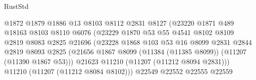 \begin{lexlean}{RustStd}
\begin{coremodule}
                                        @1872
                                        @1879
                                        @1886
                                        @13
                                        @8103
                                        @8112
                                        @2831
                                        @8127
                                        (@23220
                                          @1871
                                          @489
                                          @18163
                                          @8103
                                          @8110
                                          @6076
                                          (@23229
                                            @1870
                                            @53
                                            @55
                                            @4541
                                            @8102
                                            @8109
                                            @2819
                                            @8083
                                            @2825
                                            @21696
                                            (@23228
                                              @1868
                                              @103
                                              @53
                                              @16
                                              @8099
                                              @2831
                                              @2844
                                              @2819
                                              @8093
                                              @2825
                                              (@21656
                                                @1867
                                                @8099
                                                (@11384 (@11385 @8099))
                                                (@11207 (@11390 @1867 @53)))
                                              @21623
                                              @11210
                                              (@11207 (@11212 @8094 @2831)))
                                            @11210
                                            (@11207 (@11212 @8084 @8102)))
                                          @22549
                                          @22552
                                          @22555
                                          @22559

\end{coremodule}
\end{lexlean}
